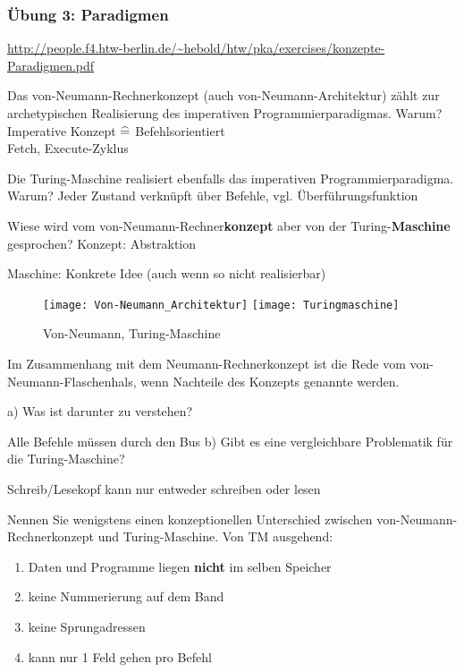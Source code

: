 \begin{card}
	\frametitle{Übung 3: Paradigmen}
	\url{http://people.f4.htw-berlin.de/~hebold/htw/pka/exercises/konzepte-Paradigmen.pdf}
\end{card}

\begin{card}
	Das von-Neumann-Rechnerkonzept (auch von-Neumann-Architektur) zählt zur archetypischen Realisierung des imperativen Programmierparadigmas. Warum?
	\hr
	Imperative Konzept $\mathrel{\widehat{=}}$ Befehlsorientiert\\
	Fetch, Execute-Zyklus
\end{card}

\begin{card}
Die Turing-Maschine realisiert ebenfalls das imperativen Programmierparadigma. Warum?
\hr
Jeder Zustand verknüpft über Befehle, vgl. Überführungsfunktion
\end{card}

\begin{card}
	Wiese wird vom von-Neumann-Rechner\textbf{konzept} aber von der Turing-\textbf{Maschine} gesprochen?
	\hr
	Konzept: Abstraktion
	
	Maschine: Konkrete Idee (auch wenn so nicht realisierbar)
	\begin{figure}[h]
	\centering
	\texttt{[image: Von-Neumann\_Architektur]}
	\texttt{[image: Turingmaschine]}
	\caption{Von-Neumann, Turing-Maschine}
	\end{figure}
\end{card}

\begin{card}
	Im Zusammenhang mit dem Neumann-Rechnerkonzept ist die Rede vom von-Neumann-Flaschenhals, wenn Nachteile des Konzepts genannte werden.
	
	\hr
	a) Was ist darunter zu verstehen?
	
	Alle Befehle müssen durch den Bus
	\hr
	b) Gibt es eine vergleichbare Problematik für die Turing-Maschine? 
	
	Schreib/Lesekopf kann nur entweder schreiben oder lesen
\end{card}

\begin{card}
	Nennen Sie wenigstens einen konzeptionellen Unterschied zwischen von-Neumann-Rechnerkonzept und Turing-Maschine.
	\hr
	Von TM ausgehend:
	
	\begin{enumerate}
	\item Daten und Programme liegen \textbf{nicht} im selben Speicher
	\item keine Nummerierung auf dem Band
	\item keine Sprungadressen
	\item kann nur 1 Feld gehen pro Befehl
	\end{enumerate}
\end{card}


